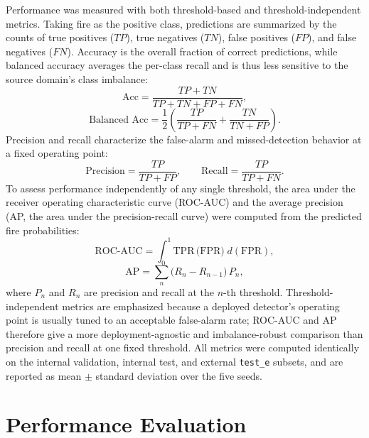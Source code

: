 \documentclass[conference]{IEEEtran}
\begin{document}
Performance was measured with both threshold-based and threshold-independent metrics. Taking fire as the positive class, predictions are summarized by the counts of true positives ($TP$), true negatives ($TN$), false positives ($FP$), and false negatives ($FN$). Accuracy is the overall fraction of correct predictions, while balanced accuracy averages the per-class recall and is thus less sensitive to the source domain's class imbalance:
\begin{equation}
\text{Acc} = \frac{TP+TN}{TP+TN+FP+FN},
\label{eq:acc}
\end{equation}
\begin{equation}
\text{Balanced Acc} = \frac{1}{2}\!\left(\frac{TP}{TP+FN} + \frac{TN}{TN+FP}\right).
\label{eq:bacc}
\end{equation}
Precision and recall characterize the false-alarm and missed-detection behavior at a fixed operating point:
\begin{equation}
\text{Precision} = \frac{TP}{TP+FP},
\qquad
\text{Recall} = \frac{TP}{TP+FN}.
\label{eq:pr}
\end{equation}
To assess performance independently of any single threshold, the area under the receiver operating characteristic curve (ROC-AUC) and the average precision (AP, the area under the precision-recall curve) were computed from the predicted fire probabilities:
\begin{equation}
\text{ROC-AUC} = \int_{0}^{1}\!\text{TPR}\,\big(\text{FPR}\big)\; d(\text{FPR}),
\label{eq:auc}
\end{equation}
\begin{equation}
\text{AP} = \sum_{n}\big(R_n - R_{n-1}\big)\,P_n,
\label{eq:ap}
\end{equation}
where $P_n$ and $R_n$ are precision and recall at the $n$-th threshold. Threshold-independent metrics are emphasized because a deployed detector's operating point is usually tuned to an acceptable false-alarm rate; ROC-AUC and AP therefore give a more deployment-agnostic and imbalance-robust comparison than precision and recall at one fixed threshold. All metrics were computed identically on the internal validation, internal test, and external \texttt{test\_e} subsets, and are reported as mean $\pm$ standard deviation over the five seeds.


\section{Performance Evaluation}
\end{document}
